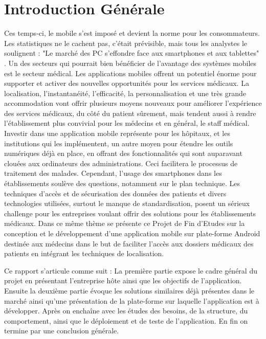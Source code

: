 
\chapter{Introduction Générale}

Ces temps-ci, le mobile s’est imposé et devient la norme pour les consommateurs.
Les statistiques ne le cachent pas, c’était prévisible, mais tous les analystes
le soulignent : "Le marché des PC s’effondre face aux smartphones et aux
tablettes" \cite{venturebeat.com}. Un des secteurs qui pourrait bien bénéficier
de l’avantage des systèmes mobiles est le secteur médical. Les applications
mobiles offrent un potentiel énorme pour supporter et activer des nouvelles
opportunités pour les services médicaux. La localisation, l’instantanéité,
l’efficacité, la personnalisation et une très grande accommodation vont offrir
plusieurs moyens nouveaux pour améliorer l’expérience des services médicaux, du
côté du patient sûrement, mais tendent aussi à rendre l’établissement plus
convivial pour les médecins et en général, le staff médical. Investir dans une
application mobile représente pour les hôpitaux, et les institutions qui les
implémentent, un autre moyen pour étendre les outils numériques déjà en place,
en offrant des fonctionnalités qui sont auparavant clouées  aux ordinateurs des
administrations. Ceci facilitera le processus de traitement des malades.
Cependant, l’usage des smartphones dans les établissements soulève des
questions, notamment sur le plan technique. Les techniques d’accès et de
sécurisation des données des patients et divers technologies utilisées, surtout
le manque de standardisation, posent un sérieux challenge pour les entreprises
voulant offrir des solutions pour les établissements médicaux. Dans ce même
thème se présente ce Projet de Fin d’Etudes sur la conception et le
développement d’une application mobile sur plate-forme Android destinée aux
médecins dans le but de faciliter l’accès aux dossiers médicaux des patients en
intégrant les techniques de localisation.

Ce rapport s'articule comme suit : La première partie expose le cadre
général du projet en présentant l’entreprise hôte ainsi que les objectifs de
l’application. Ensuite la deuxième partie évoque les solutions similaires déjà présentes
dans le marché ainsi qu’une présentation de la plate-forme sur laquelle
l’application est à développer. Après on enchaîne avec les études des besoins, de la structure, du comportement, ainsi que le déploiement et de teste de l'application. En fin on termine par une conclusion générale.
